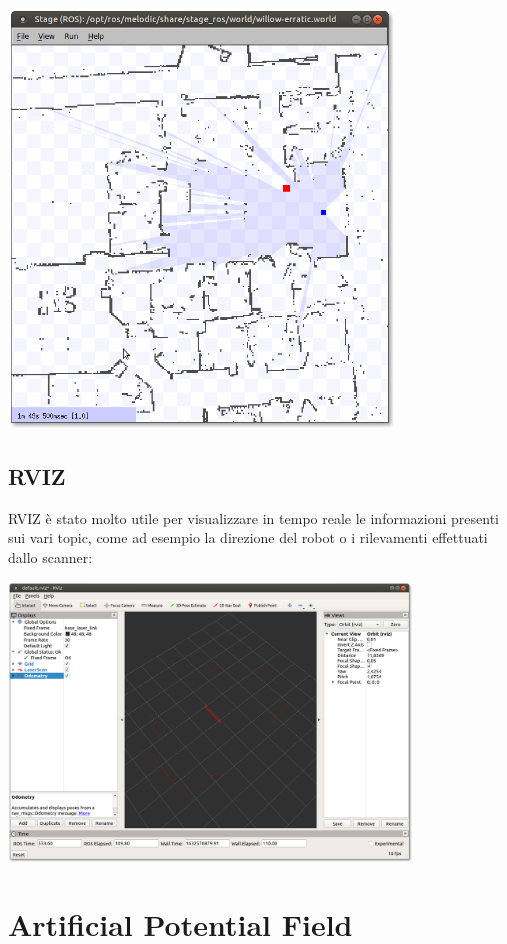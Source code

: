 \documentclass[Lau, binding=0.6cm, oneside]{sapthesis}
\begin{document}
\vspace{1em}
\includegraphics[height=30em]{stage_ros.png}

\subsection{RVIZ}
RVIZ è stato molto utile per visualizzare in tempo reale le informazioni presenti sui vari topic, come ad esempio la direzione del robot o i rilevamenti effettuati dallo scanner:

\vspace{1em}
\includegraphics[height=20em]{rviz.png}

\section{Artificial Potential Field}
\end{document}
